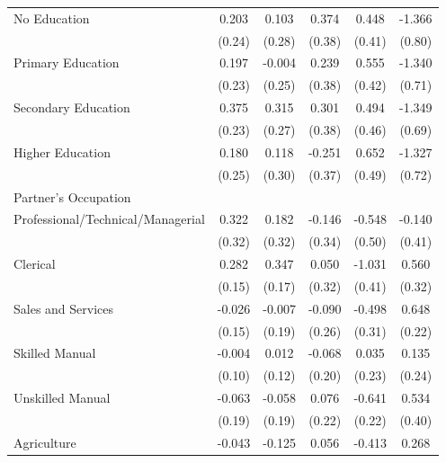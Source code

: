 \begin{longtable}{l*{5}{c}}
\hspace{1em}No Education & 0.203 & 0.103 & 0.374 & 0.448 & -1.366\sym{*} \\
                    & (0.24) & (0.28) & (0.38) & (0.41) & (0.80) \\
\hspace{1em}Primary Education & 0.197 & -0.004 & 0.239 & 0.555 & -1.340\sym{*} \\
                    & (0.23) & (0.25) & (0.38) & (0.42) & (0.71) \\
\hspace{1em}Secondary Education & 0.375 & 0.315 & 0.301 & 0.494 & -1.349\sym{*} \\
                    & (0.23) & (0.27) & (0.38) & (0.46) & (0.69) \\
\hspace{1em}Higher Education & 0.180 & 0.118 & -0.251 & 0.652 & -1.327\sym{*} \\
                    & (0.25) & (0.30) & (0.37) & (0.49) & (0.72) \\
\multicolumn{6}{l}{Partner's Occupation} \\
\hspace{1em}Professional/Technical/Managerial & 0.322 & 0.182 & -0.146 & -0.548 & -0.140 \\
                    & (0.32) & (0.32) & (0.34) & (0.50) & (0.41) \\
\hspace{1em}Clerical & 0.282\sym{*} & 0.347\sym{**} & 0.050 & -1.031\sym{**} & 0.560\sym{*} \\
                    & (0.15) & (0.17) & (0.32) & (0.41) & (0.32) \\
\hspace{1em}Sales and Services & -0.026 & -0.007 & -0.090 & -0.498 & 0.648\sym{***} \\
                    & (0.15) & (0.19) & (0.26) & (0.31) & (0.22) \\
\hspace{1em}Skilled Manual & -0.004 & 0.012 & -0.068 & 0.035 & 0.135 \\
                    & (0.10) & (0.12) & (0.20) & (0.23) & (0.24) \\
\hspace{1em}Unskilled Manual & -0.063 & -0.058 & 0.076 & -0.641\sym{***} & 0.534 \\
                    & (0.19) & (0.19) & (0.22) & (0.22) & (0.40) \\
\hspace{1em}Agriculture & -0.043 & -0.125 & 0.056 & -0.413 & 0.268 \\

\end{longtable}
